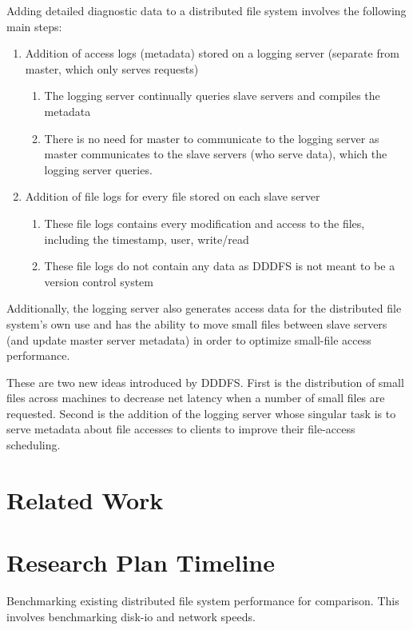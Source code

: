 \documentclass{article}
\begin{document}
Adding detailed diagnostic data to a distributed file system involves the following main steps:

\begin{enumerate}
\item Addition of access logs (metadata) stored on a logging server (separate from master, which only serves requests)
	\begin{enumerate}
	\item The logging server continually queries slave servers and compiles the metadata
	\item There is no need for master to communicate to the logging server as master communicates to the slave servers (who serve data), which the logging server queries. 
	\end{enumerate}
\item Addition of file logs for every file stored on each slave server
	\begin{enumerate}
	\item These file logs contains every modification and access to the files, including the timestamp, user, write/read
	\item These file logs do not contain any data as DDDFS is not meant to be a version control system
	\end{enumerate}
\end{enumerate}

Additionally, the logging server also generates access data for the distributed file system's own use and has the ability to move small files between slave servers (and update master server metadata) in order to optimize small-file access performance. 

These are two new ideas introduced by DDDFS. First is the distribution of small files across machines to decrease net latency when a number of small files are requested. Second is the addition of the logging server whose singular task is to serve metadata about file accesses to clients to improve their file-access scheduling. 

\section{Related Work}

\section{Research Plan Timeline}

Benchmarking existing distributed file system performance for comparison. This involves benchmarking disk-io and network speeds. 
\end{document}
